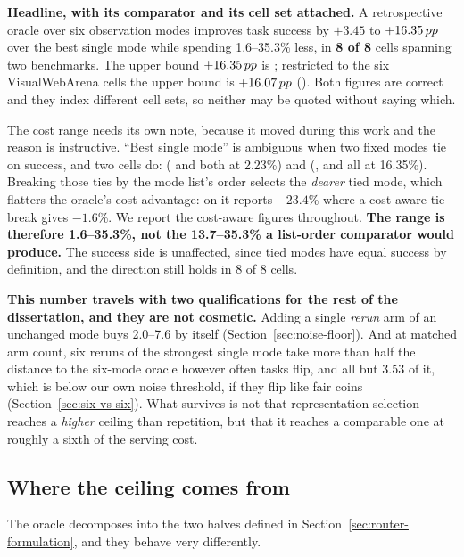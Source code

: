 \begin{scopebox}
\textbf{Headline, with its comparator and its cell set attached.} A
retrospective oracle over six observation modes improves task success by
$+3.45$ to $+16.35\,pp$ over the best single mode while spending 1.6--35.3\%
less, in \textbf{8 of 8} cells spanning two benchmarks. The upper bound
$+16.35\,pp$ is ; restricted to the six VisualWebArena
cells the upper bound is $+16.07\,pp$ (). Both figures are
correct and they index different cell sets, so neither may be quoted without
saying which.

The cost range needs its own note, because it moved during this work and the
reason is instructive. ``Best single mode'' is ambiguous when two fixed modes tie
on success, and two cells do:  (\mSoM{} and \mVis{} both at
2.23\%) and  (\mDOM{}, \mPT{} and \mPP{} all at
16.35\%). Breaking those ties by the mode list's order selects the
\emph{dearer} tied mode, which flatters the oracle's cost advantage: on
 it reports $-23.4$\% where a cost-aware tie-break gives
$-1.6$\%. We report the cost-aware figures throughout. \textbf{The range is
therefore 1.6--35.3\%, not the 13.7--35.3\% a list-order comparator would
produce.} The success side is unaffected, since tied modes have equal success by definition, and the direction still holds in 8 of 8 cells.

\textbf{This number travels with two qualifications for the rest of the dissertation, and they are not cosmetic.} Adding a single \emph{rerun} arm of an
unchanged mode buys 2.0--7.6\pp{} by itself
(Section~\ref{sec:noise-floor}). And at matched arm count, six reruns of the
strongest single mode take more than half the distance to the six-mode oracle
however often tasks flip, and all but 3.53\pp{} of it, which is below our own
noise threshold, if they flip like fair coins (Section~\ref{sec:six-vs-six}). What survives is
not that representation selection reaches a \emph{higher} ceiling than
repetition, but that it reaches a comparable one at roughly a sixth of the
serving cost.
\end{scopebox}

\subsection{Where the ceiling comes from}

The oracle decomposes into the two halves defined in
Section~\ref{sec:router-formulation}, and they behave very differently.

